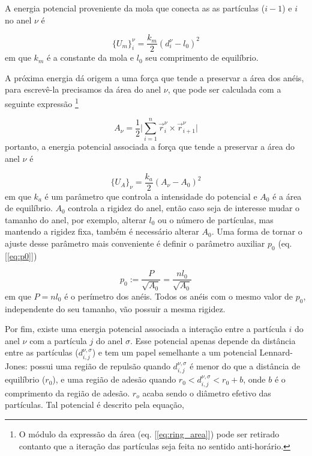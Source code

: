 \documentclass{article}
\theoremstyle{definition}
\def \quantity#1#2#3{\vec{#1}_{#2}^{#3}}
\def \quantitysc#1#2#3{{#1}_{#2}^{#3}}
\def \quantitygsc#1#2#3#4#5{{#1}_{#2, #3}^{#4, #5}}
\def \pos#1#2{\quantity{r}{#1}{#2}}
\def \deslocsc#1#2{\quantitysc{d}{#1}{#2}}
\def \deslocgsc#1#2#3#4{\quantitygsc{d}{#1}{#2}{#3}{#4}}
\begin{document}
A energia potencial proveniente da mola que conecta as as partículas ($i-1$) e $i$ no anel $\nu$ é

\begin{equation}
    {\{U_m\}}_{i}^{\nu} = \frac{k_m}{2}(\deslocsc{i}{\nu} - l_0)^2
\label{eq:spring_pot}
\end{equation}
em que $k_m$ é a constante da mola e $l_0$ seu comprimento de equilíbrio.

A próxima energia dá origem a uma força que tende a preservar a área dos anéis, para escrevê-la precisamos da área do anel $\nu$, que pode ser calculada com a seguinte expressão \footnote{O módulo da expressão da área (eq. [\ref{eq:ring_area}]) pode ser retirado contanto que a iteração das partículas seja feita no sentido anti-horário.}

\begin{equation}
    A_\nu = \frac{1}{2}\bigg|\sum_{i=1}^{n}\pos{i}{\nu} \times \pos{i+1}{\nu} \bigg| 
\label{eq:ring_area}
\end{equation}
portanto, a energia potencial associada a força que tende a preservar a área do anel $\nu$ é

\begin{equation}
    {\{U_A\}}_{\nu} = \frac{k_a}{2}(A_{\nu} - A_0)^2
\label{eq:area_pot}
\end{equation}
em que $k_a$ é um parâmetro que controla a intensidade do potencial e $A_0$ é a área de equilíbrio.  $A_0$ controla a rigidez do anel, então caso seja de interesse mudar o tamanho do anel, por exemplo, alterar $l_0$ ou o número de partículas, mas mantendo a rigidez fixa, também é necessário alterar $A_0$. Uma forma de tornar o ajuste desse parâmetro mais conveniente é definir o parâmetro auxiliar $p_0$ (eq. [\ref{eq:p0}])

\begin{equation}
    p_0 := \frac{P}{\sqrt{A_0}} = \frac{n l_0}{\sqrt{A_0}}
    \label{eq:p0}
\end{equation}
em que $P = n l_0$ é o perímetro dos anéis. Todos os anéis com o mesmo valor de $p_0$, independente do seu tamanho, vão possuir a mesma rigidez.

Por fim, existe uma energia potencial associada a interação entre a partícula $i$ do anel $\nu$ com a partícula $j$ do anel $\sigma$. Esse potencial apenas depende da distância entre as partículas ($\deslocgsc{i}{j}{\nu}{\sigma}$) e tem um papel semelhante a um potencial Lennard-Jones: possui uma região de repulsão quando $\deslocgsc{i}{j}{\nu}{\sigma}$ é menor do que a distância de equilíbrio ($r_0$), e uma região de adesão quando $r_0 < \deslocgsc{i}{j}{\nu}{\sigma} < r_0 + b$, onde $b$ é o comprimento da região de adesão. $r_o$ acaba sendo o diâmetro efetivo das partículas. Tal potencial é descrito pela equação, %
\end{document}
